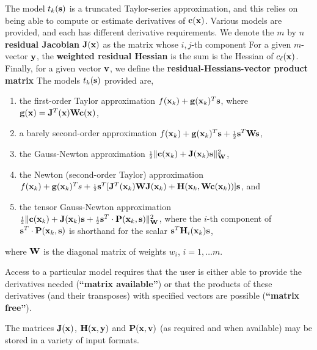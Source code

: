 \documentclass{galahad}
\begin{document}
The model $t_k({\mathbf{s}})$ is a truncated Taylor-series approximation, and this
relies on being able to compute or estimate derivatives of ${\mathbf{c}}({\mathbf{x}})$.
Various models are provided, and each has different derivative requirements.
We denote the $m$ by $n$ {\bf residual Jacobian} ${\mathbf{J}}({\mathbf{x}})$ as the matrix
whose $i,j$-th component
For a given $m$-vector ${\mathbf{y}}$, the
{\bf weighted residual Hessian} is the sum
is the Hessian of $c_\ell({\mathbf{x}})$.
Finally, for a given vector ${\mathbf{v}}$, we define
the {\bf residual-Hessians-vector product matrix}
The models $t_k({\mathbf{s}})$ provided are,
\begin{enumerate}
\item the first-order Taylor approximation $f({\mathbf{x}}_k) + {\mathbf{g}}({\mathbf{x}}_k)^T {\mathbf{s}}$,
where
${\mathbf{g}}({\mathbf{x}}) = {\mathbf{J}}^T({\mathbf{x}}) {\mathbf{W}} {\mathbf{c}}({\mathbf{x}})$,
\item a barely second-order approximation
$f({\mathbf{x}}_k) + {\mathbf{g}}({\mathbf{x}}_k)^T {\mathbf{s}} + {\scriptstyle \frac{1}{2}} {\mathbf{s}}^T {\mathbf{W}} {\mathbf{s}}$,
\item the Gauss-Newton approximation
${\scriptstyle \frac{1}{2}} \| {\mathbf{c}}({\mathbf{x}}_k) + {\mathbf{J}}({\mathbf{x}}_k) {\mathbf{s}}\|_{{\mathbf{W}}}^2$,
\item the Newton (second-order Taylor) approximation
  $f({\mathbf{x}}_k) + {\mathbf{g}}({\mathbf{x}}_k)^T s + {\scriptstyle \frac{1}{2}} {\mathbf{s}}^T
  [ {\mathbf{J}}^T({\mathbf{x}}_k) {\mathbf{W}} {\mathbf{J}}({\mathbf{x}}_k) +
{\mathbf{H}}({\mathbf{x}}_k,{\mathbf{W}} {\mathbf{c}}({\mathbf{x}}_k))] {\mathbf{s}}$, and
\item the tensor Gauss-Newton approximation
${\scriptstyle \frac{1}{2}} \| {\mathbf{c}}({\mathbf{x}}_k) + {\mathbf{J}}({\mathbf{x}}_k) {\mathbf{s}} +
 {\scriptstyle \frac{1}{2}} {\mathbf{s}}^T \cdot {\mathbf{P}}({\mathbf{x}}_k,{\mathbf{s}}) \|_{{\mathbf{W}}}^2$,
where the $i$-th component of ${\mathbf{s}}^T \cdot {\mathbf{P}}({\mathbf{x}}_k,{\mathbf{s}})$ is
shorthand for the scalar ${\mathbf{s}}^T {\mathbf{H}}_i({\mathbf{x}}_k) {\mathbf{s}}$,
\end{enumerate}
where ${\mathbf{W}}$ is the diagonal matrix of weights $w_i$, $i = 1, \ldots m$.

\noindent
Access to a particular model requires that the user is either able to
provide the derivatives needed ({\bf ``matrix available''}) or that the products
of these derivatives (and their transposes) with specified vectors are possible
({\bf ``matrix free''}).


\galmatrix The matrices ${\mathbf{J}}({\mathbf{x}})$, ${\mathbf{H}}({\mathbf{x}},{\mathbf{y}})$ and ${\mathbf{P}}({\mathbf{x}},{\mathbf{v}})$
(as required and when available) may be stored in a variety of input formats.
\end{document}
